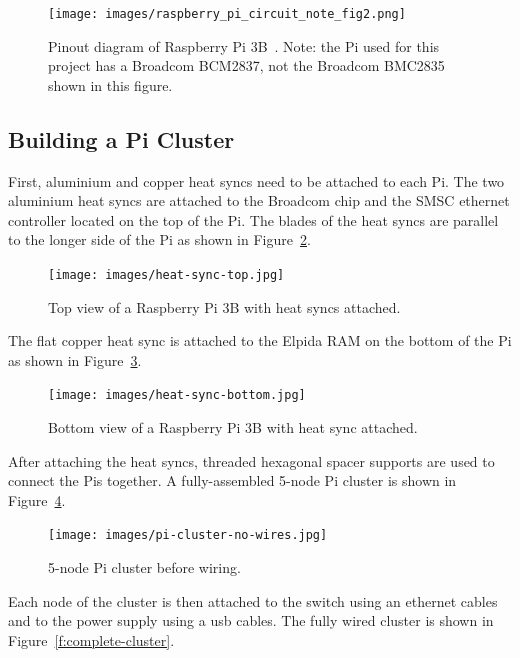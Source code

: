 \begin{figure}[!ht]
  \centering\texttt{[image: images/raspberry\_pi\_circuit\_note\_fig2.png]} \caption{Pinout
  diagram of Raspberry Pi 3B~\cite{hid-sp18-419-pi-pinout}. Note: the
  Pi used for this project has a Broadcom BCM2837, not the Broadcom
  BMC2835 shown in this figure.}\label{f:pinout-diagram}
\end{figure}

\subsection{Building a Pi Cluster}
First, aluminium and copper heat syncs need to be attached to each
Pi. The two aluminium heat syncs are attached to the Broadcom chip and
the SMSC ethernet controller located on the top of the Pi. The blades
of the heat syncs are parallel to the longer side of the Pi as shown
in Figure~\ref{f:heat-sync-top}.

\begin{figure}[!ht]
  \centering\texttt{[image: images/heat-sync-top.jpg]} \caption{Top
  view of a Raspberry Pi 3B with heat syncs
  attached.}\label{f:heat-sync-top}
\end{figure}

The flat copper heat sync is attached to the Elpida RAM on the bottom
of the Pi as shown in Figure~\ref{f:heat-sync-bottom}.

\begin{figure}[!ht]
  \centering\texttt{[image: images/heat-sync-bottom.jpg]} \caption{Bottom
  view of a Raspberry Pi 3B with heat sync
  attached.}\label{f:heat-sync-bottom}
\end{figure}

After attaching the heat syncs, threaded hexagonal spacer supports are
used to connect the Pis together. A fully-assembled 5-node Pi cluster
is shown in Figure~\ref{f:cluster-no-wires}.

\begin{figure}[!ht]
  \centering\texttt{[image: images/pi-cluster-no-wires.jpg]}
  \caption{5-node Pi cluster before wiring.}\label{f:cluster-no-wires}
\end{figure}

Each node of the cluster is then attached to the switch using an
ethernet cables and to the power supply using a usb cables. The fully
wired cluster is shown in Figure~\ref{f:complete-cluster}.

